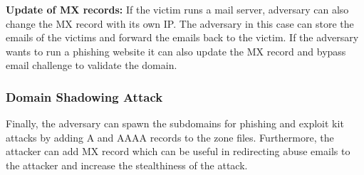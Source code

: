 \textbf{Update of MX records:} 
If the victim runs a mail server, adversary can also change the MX record with its own IP. The adversary in this case can store the emails of the victims and forward the emails back to the victim. If the adversary wants to run a phishing website it can also update the MX record and bypass email challenge to validate the domain. 







\subsubsection{Domain Shadowing Attack}

Finally, the adversary can spawn the subdomains for phishing and exploit kit attacks by adding A and AAAA records to the zone files. Furthermore, the attacker can add MX record which can be useful in redirecting abuse emails to the attacker and increase the stealthiness of the attack. 

